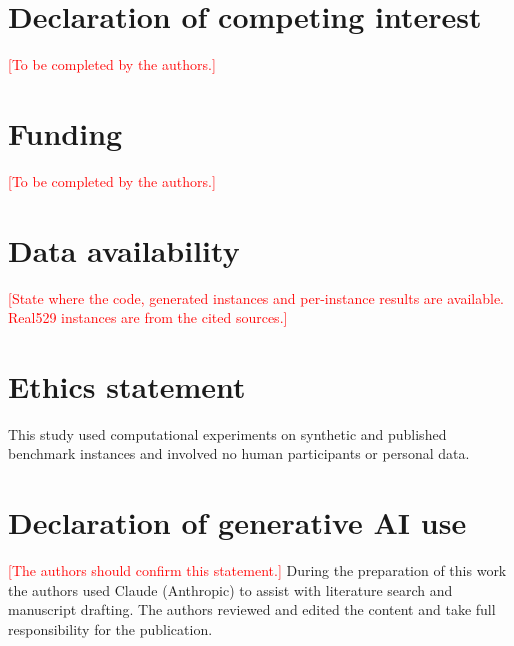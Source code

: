 \documentclass[preprint,12pt,authoryear]{elsarticle}
\newcommand{\placeholder}[1]{\textcolor{red}{[#1]}}
\begin{document}
\section*{Declaration of competing interest}
\placeholder{To be completed by the authors.}

\section*{Funding}
\placeholder{To be completed by the authors.}

\section*{Data availability}
\placeholder{State where the code, generated instances and per-instance results are available. Real529 instances are from the cited sources.}

\section*{Ethics statement}
This study used computational experiments on synthetic and published benchmark instances and involved no human participants or personal data.

\section*{Declaration of generative AI use}
\placeholder{The authors should confirm this statement.} During the preparation of this work the authors used Claude (Anthropic) to assist with literature search and manuscript drafting. The authors reviewed and edited the content and take full responsibility for the publication.



\end{document}
